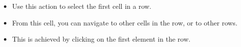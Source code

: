 \begin{itemize}
\item Use this action to select the first cell in a row.
\item From this cell, you can navigate to other cells in the row, or to other rows.
\item This is achieved by clicking on the first element in the row. 
\end{itemize}

